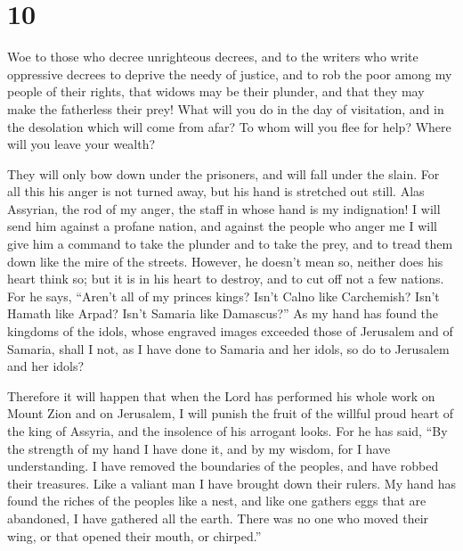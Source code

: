 \hypertarget{section-9}{%
\section{10}\label{section-9}}

 Woe to those who decree unrighteous decrees, and to the
writers who write oppressive decrees  to deprive the needy
of justice, and to rob the poor among my people of their rights, that
widows may be their plunder, and that they may make the fatherless their
prey!  What will you do in the day of visitation, and in
the desolation which will come from afar? To whom will you flee for
help? Where will you leave your wealth?

 They will only bow down under the prisoners, and will
fall under the slain. For all this his anger is not turned away, but his
hand is stretched out still.  Alas Assyrian, the rod of my
anger, the staff in whose hand is my indignation!  I will
send him against a profane nation, and against the people who anger me I
will give him a command to take the plunder and to take the prey, and to
tread them down like the mire of the streets.  However, he
doesn't mean so, neither does his heart think so; but it is in his heart
to destroy, and to cut off not a few nations.  For he
says, ``Aren't all of my princes kings?  Isn't Calno like
Carchemish? Isn't Hamath like Arpad? Isn't Samaria like Damascus?''
 As my hand has found the kingdoms of the idols, whose
engraved images exceeded those of Jerusalem and of Samaria,
 shall I not, as I have done to Samaria and her idols, so
do to Jerusalem and her idols?

 Therefore it will happen that when the Lord has
performed his whole work on Mount Zion and on Jerusalem, I will punish
the fruit of the willful proud heart of the king of Assyria, and the
insolence of his arrogant looks.  For he has said, ``By
the strength of my hand I have done it, and by my wisdom, for I have
understanding. I have removed the boundaries of the peoples, and have
robbed their treasures. Like a valiant man I have brought down their
rulers.  My hand has found the riches of the peoples like
a nest, and like one gathers eggs that are abandoned, I have gathered
all the earth. There was no one who moved their wing, or that opened
their mouth, or chirped.''

